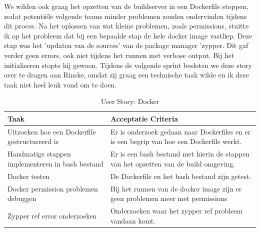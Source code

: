 \documentclass[a4paper]{report}
\newcommand{\userstorycolor}{PeachPuff1}
\begin{document}
  \begin{tcolorbox}[colback=white, coltitle=black, colframe=\userstorycolor, title=\textbf{User Story: }Als developer wil ik een build omgeving hebben in een container\, zodat ik makkelijker kan ontwikkelen en makkelijker het project kan overdragen.]
    \par\smallskip 
    We wilden ook graag het opzetten van de buildserver in een Dockerfile stoppen, zodat potentiële volgende teams minder problemen zouden ondervinden tijdens dit proces.
    Na het oplossen van wat kleine problemen, zoals permissions, stuitte ik op het probleem dat bij een bepaalde stap de hele docker image vastliep.
    Deze stap was het 'updaten van de sources' van de package manager 'zypper. Dit gaf verder geen errors, ook niet tijdens het runnen met verbose output.
    Bij het initialiseren stopte hij gewoon.
    Tijdens de volgende sprint besloten we deze story over te dragen aan Rinske, omdat zij graag een technische taak wilde en ik deze taak niet heel leuk vond om te doen.
      \begin{table}[H]
        \centering
      \begin{tabularx}{1\textwidth}{|X|X|}
        \hline
        \cellcolor[HTML]{ffcc99} \textbf{Taak} & \cellcolor[HTML]{ffcc99} \textbf{Acceptatie Criteria} \\ 
        \hline
        Uitzoeken hoe een Dockerfile gestructureerd is & Er is onderzoek gedaan naar Dockerfiles en er is een begrip van hoe een Dockerfile werkt. \\
        \hline
        Handmatige stappen implementeren in bash bestand & Er is een bash bestand met hierin de stappen van het opzetten van de build omgeving. \\ 
        \hline 
        Docker testen & De Dockerfile en het bash bestand zijn getest. \\ 
        \hline 
        Docker permission problemen debuggen & Bij het runnen van de docker image zijn er geen problemen meer met permissions \\
        \hline 
        Zypper ref error onderzoeken & Onderzoeken waar het zypper ref probleem vandaan komt. \\ 
        \hline 
      \end{tabularx}
      \caption{User Story: Docker}
    \label{table:it2:story_docker}
    \end{table}
    \end{tcolorbox}
\end{document}
